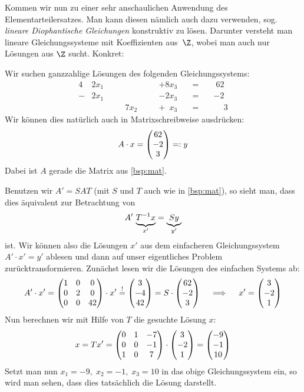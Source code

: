 Kommen wir nun zu einer sehr anschaulichen Anwendung des Elementarteilersatzes.
Man kann diesen nämlich auch dazu verwenden, sog. \emph{lineare Diophantische
Gleichungen} konstruktiv zu lösen. Darunter versteht man lineare
Gleichungssysteme mit Koeffizienten aus~$\Z$, wobei man auch nur Lösungen aus
$\Z$ sucht. Konkret:

\begin{thBeisp}
    Wir suchen ganzzahlige Lösungen des folgenden Gleichungssystems:
    \begin{alignat*}{4}
         &2x_1  &\quad&      &\quad&            +8x_3  &\quad=&\quad \; 62             \\
        -&2x_1  &\quad&      &\quad&            -2x_3  &\quad=&\quad            {-2}   \\
         &      &\quad& 7x_2 &\quad& +\phantom{1} x_3  &\quad=&\quad \phantom{+}  3
    \end{alignat*}
    Wir können dies natürlich auch in Matrixschreibweise ausdrücken:
    \[ A \cdot x = \begin{pmatrix} 62\\-2\\3 \end{pmatrix} =: y \]
    Dabei ist $A$ gerade die Matrix aus \cref{bsp:mat}.
    
    Benutzen wir $A' = S\!AT$ (mit $S$ und $T$ auch wie in \cref{bsp:mat}), so
    sieht man, dass dies äquivalent zur Betrachtung von
    \[ A' \, \underbrace{ T^{-1} x \vphantom{y} }_{x'} = \underbrace{Sy}_{y'} \]
    ist. Wir können also die Lösungen $x'$ aus dem einfacheren Gleichungssystem
    $A' \cdot x' = y'$ ablesen und dann auf unser eigentliches Problem
    zurücktransformieren. Zunächst lesen wir die Lösungen des einfachen Systems
    ab:
    \[ A' \cdot x' = \begin{pmatrix} 
                 1 &  0 &   0 \\
                 0 &  2 &   0 \\
                 0 &  0 &  42   \end{pmatrix} \cdot x' \overset{!}{=}
       \begin{pmatrix} 3\\-4\\42 \end{pmatrix} 
       = S \cdot \begin{pmatrix} 62\\-2\\3 \end{pmatrix}
       \quad
       \implies
       \quad
       x' = \begin{pmatrix} 3\\-2\\1 \end{pmatrix}  \]
    Nun berechnen wir mit Hilfe von $T$ die gesuchte Lösung $x$:
    \[ x = T x' = 
            \begin{pmatrix} 
             0 &  1 & -7 \\
             0 &  0 & -1 \\
             1 &  0 &  7   \end{pmatrix} \cdot \begin{pmatrix} 3\\-2\\1 \end{pmatrix}
         = \begin{pmatrix} -9\\-1\\10 \end{pmatrix} \]
    Setzt man nun $x_1 = -9,\; x_2 = -1,\; x_3 = 10$ in das obige
    Gleichungssystem ein, so wird man sehen, dass dies tatsächlich die
    Lösung darstellt.
\end{thBeisp}

